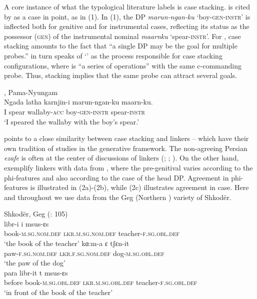 \documentclass[output=paper]{langsci/langscibook}
\begin{document}
A core instance of what the typological literature labels  \citep{Plank1995} is case stacking.  is cited by \citet{Richards2013} as a case in point, as in (1). In (1), the DP \textit{marun-ngan-ku} ‘boy-\textsc{gen-instr}’ is inflected both for genitive and for instrumental cases, reflecting its status as the possessor (\textsc{gen}) of the instrumental nominal \textit{maarnku} ‘spear-\textsc{instr}’. For \citet[62]{Merchant2006}, case stacking amounts to the fact that “a single DP may be the goal for multiple probes.” \citet{Richards2013} in turn speaks of ‘’ as the process responsible for case stacking configurations, where  is “a series of  operations” with the same c-commanding probe. Thus, stacking implies that the same probe can attract several goals.

\ea%
, Pama-Nyungam \citep[43]{Richards2013}\\
\gll  Ngada latha   karnjin-i   marun-ngan-ku   maarn-ku.\\
I   spear   wallaby-\textsc{acc} boy-\textsc{gen-instr}  spear-\textsc{instr}\\
\glt ‘I speared the wallaby with the boy’s spear.’        
\z

\citet{Plank1995} points to a close similarity between case stacking and linkers – which have their own tradition of studies in the generative framework. The non-agreeing Persian \textit{ezafe} is often at the center of discussions of linkers (\citealt{Dikken2004}; \citealt{Larson2008}; \citealt{Richards2010}). On the other hand, \citet{Franco2015} exemplify linkers with data from , where the pre-genitival  varies according to the phi-features and also according to the case of the head DP. Agreement in phi-features is illustrated in (2a)-(2b), while (2c) illustrates agreement in case. Here and throughout we use data from the Geg (Northern ) variety of Shkodër.

\ea%
    Shkodër, Geg   (\citealt{Manzini2011Reducing}: 105)\label{ex:manzini:2}\\
    \ea
    \gll libr-i          i       msus-ɛs   \\
            book-\textsc{m.sg.nom.def}  \textsc{lkr.m.sg.nom.def}   teacher-\textsc{f.sg.obl.def} \\
    \glt    ‘the book of the teacher’
    \ex
    \gll kɑ:m-a      ɛ          tʃɛn-it                \\
         paw-\textsc{f.sg.nom.def}   \textsc{lkr.f.sg.nom.def}  dog-\textsc{m.sg.obl.def}  \\
    \glt ‘the paw of the dog’\\
    \ex
    \gll paɾa     libr-it       t       msus-ɛs\\
         before   book-\textsc{m.sg.obl.def}  \textsc{lkr.m.sg.obl.def}  teacher-\textsc{f.sg.obl.def}\\
    \glt ‘in front of the book of the teacher’ 
    \z
\z 
\end{document}
